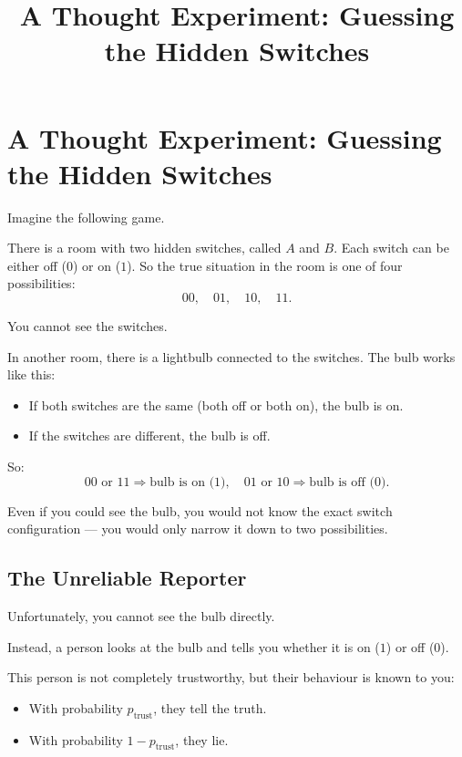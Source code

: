 \documentclass[11pt]{article}
\theoremstyle{remark}
\begin{document}
\title{A Thought Experiment: Guessing the Hidden Switches}
\author{}
\date{}
\maketitle

\section{A Thought Experiment: Guessing the Hidden Switches}

Imagine the following game.

There is a room with two hidden switches, called \(A\) and \(B\). Each switch can be either off (\(0\)) or on (\(1\)). So the true situation in the room is one of four possibilities:
\[
00,\quad 01,\quad 10,\quad 11.
\]

You cannot see the switches.

In another room, there is a lightbulb connected to the switches. The bulb works like this:

\begin{itemize}
    \item If both switches are the same (both off or both on), the bulb is on.
    \item If the switches are different, the bulb is off.
\end{itemize}

So:
\[
00 \text{ or } 11 \Rightarrow \text{bulb is on (1)}, \quad
01 \text{ or } 10 \Rightarrow \text{bulb is off (0)}.
\]

Even if you could see the bulb, you would not know the exact switch configuration --- you would only narrow it down to two possibilities.

\vspace{3mm}

\subsection{The Unreliable Reporter}

Unfortunately, you cannot see the bulb directly.

Instead, a person looks at the bulb and tells you whether it is on (\(1\)) or off (\(0\)).

This person is not completely trustworthy, but their behaviour is known to you:

\begin{itemize}
    \item With probability \(p_{\text{trust}}\), they tell the truth.
    \item With probability \(1 - p_{\text{trust}}\), they lie.
\end{itemize}
\end{document}
